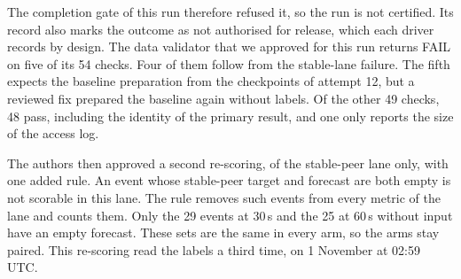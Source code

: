 The completion gate of this run therefore refused it, so the run is not certified.
Its record also marks the outcome as not authorised for release, which each driver records by design.
The data validator that we approved for this run returns FAIL on five of its 54 checks.
Four of them follow from the stable-lane failure.
The fifth expects the baseline preparation from the checkpoints of attempt 12, but a reviewed fix prepared the baseline again without labels.
Of the other 49 checks, 48 pass, including the identity of the primary result, and one only reports the size of the access log.

The authors then approved a second re-scoring, of the stable-peer lane only, with one added rule.
An event whose stable-peer target and forecast are both empty is not scorable in this lane.
The rule removes such events from every metric of the lane and counts them.
Only the 29 events at 30\,s and the 25 at 60\,s without input have an empty forecast.
These sets are the same in every arm, so the arms stay paired.
This re-scoring read the labels a third time, on 1 November at 02:59 UTC.

